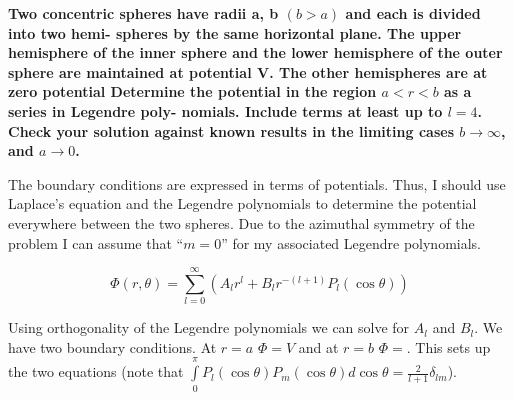 \begin{homeworkProblem}
\textbf{Two concentric spheres have radii a, b $(b > a)$ and each is divided into two hemi- 
spheres by the same horizontal plane. The upper hemisphere of the inner sphere 
and the lower hemisphere of the outer sphere are maintained at potential V. The 
other hemispheres are at zero potential 
Determine the potential in the region $a < r < b$ as a series in Legendre poly- 
nomials. Include terms at least up to $l = 4$. Check your solution against known 
results in the limiting cases $b \rightarrow \infty$, and $a \rightarrow 0$. } \\
\par
The boundary conditions are expressed in terms of potentials. Thus, I should use Laplace's equation and the Legendre polynomials to determine the potential everywhere between the two spheres. Due to the azimuthal symmetry of the problem I can assume that ``$m = 0$'' for my associated Legendre polynomials.

\[
\Phi(r,\theta) = \sum\limits_{l = 0}^{\infty} \left( A_l r^l + B_l r^{-(l+1)} P_l(\cos\theta) \right)
\]

Using orthogonality of the Legendre polynomials we can solve for $A_l$ and $B_l$. We have two boundary conditions. At $r = a$ $\Phi = V$ and at $r = b$ $\Phi = $. This sets up the two equations (note that $\int\limits_0^\pi P_l(\cos \theta)P_m(\cos \theta) d\cos\theta = \frac{2}{l + 1} \delta_{l m}$). 


\end{homeworkProblem}
